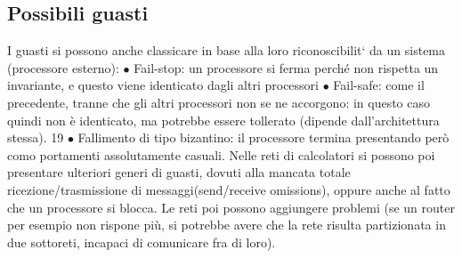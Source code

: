 \subsection{Possibili guasti}
I guasti si possono anche classicare in base alla loro riconoscibilit` da un sistema
(processore esterno):
$\bullet$ Fail-stop: un processore si ferma perché non rispetta un invariante, e
questo viene identicato dagli altri processori
$\bullet$ Fail-safe: come il precedente, tranne che gli altri processori non se ne
accorgono: in questo caso quindi non è identicato, ma potrebbe essere
tollerato (dipende dall'architettura stessa).
19
$\bullet$ Fallimento di tipo bizantino: il processore termina presentando però como
portamenti assolutamente casuali.
Nelle reti di calcolatori si possono poi presentare ulteriori generi di guasti, dovuti
alla mancata totale ricezione/trasmissione di messaggi(send/receive omissions),
oppure anche al fatto che un processore si blocca. Le reti poi possono aggiungere
problemi (se un router per esempio non rispone più, si potrebbe avere che la
rete risulta partizionata in due sottoreti, incapaci di comunicare fra di loro).
